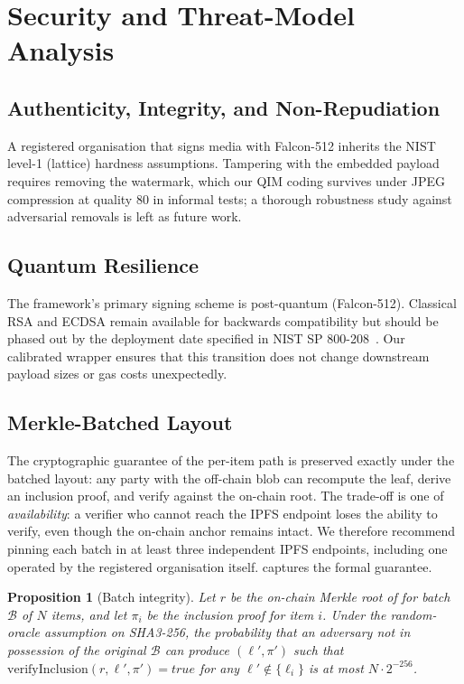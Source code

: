\documentclass[11pt,a4paper]{article}
\theoremstyle{definition}
\theoremstyle{plain}
\newtheorem{proposition}[theorem]{Proposition}
\theoremstyle{remark}
\begin{document}
\section{Security and Threat-Model Analysis}\label{sec:security}

\subsection{Authenticity, Integrity, and Non-Repudiation}
A registered organisation that signs media with Falcon-512
inherits the NIST level-1 (lattice) hardness assumptions.
Tampering with the embedded payload requires removing the
watermark, which our QIM coding survives under JPEG compression
at quality 80 in informal tests; a thorough robustness study
against adversarial removals is left as future work.

\subsection{Quantum Resilience}
The framework's primary signing scheme is post-quantum
(Falcon-512). Classical RSA and ECDSA remain available for
backwards compatibility but should be phased out by the
deployment date specified in NIST SP 800-208~\cite{bib19}. Our
calibrated wrapper ensures that this transition does not change
downstream payload sizes or gas costs unexpectedly.

\subsection{Merkle-Batched Layout}\label{sec:sec-batch}
The cryptographic guarantee of the per-item path is preserved
exactly under the batched layout: any party with the off-chain
blob can recompute the leaf, derive an inclusion proof, and
verify against the on-chain root. The trade-off is one of
\emph{availability}: a verifier who cannot reach the IPFS
endpoint loses the ability to verify, even though the on-chain
anchor remains intact. We therefore recommend pinning each
batch in at least three independent IPFS endpoints, including
one operated by the registered organisation itself.
 captures the formal guarantee.

\begin{proposition}[Batch integrity]\label{prop:integrity}
Let $r$ be the on-chain Merkle root of  for batch
$\mathcal{B}$ of $N$ items, and let $\pi_i$ be the inclusion
proof for item $i$. Under the random-oracle assumption on
SHA3-256, the probability that an adversary not in possession
of the original $\mathcal{B}$ can produce $(\ell',\pi')$ such
that $\mathrm{verifyInclusion}(r,\ell',\pi') = \mathit{true}$
for any $\ell'\notin\{\ell_i\}$ is at most $N \cdot 2^{-256}$.
\end{proposition}
\end{document}
